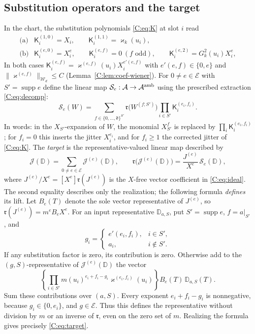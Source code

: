 \documentclass[11pt]{article}
\DeclareMathOperator{\supp}{supp}
\newcommand{\cW}{\mathcal{W}}
\newcommand{\cA}{\mathcal{A}}
\newcommand{\cE}{\mathcal{E}}
\newcommand{\cS}{\mathcal{S}}
\newcommand{\cJ}{\mathcal{J}}
\newcommand{\norm}[1]{\lVert #1\rVert}
\newcommand{\dg}{\mathfrak{d}}
\newcommand{\K}{\mathsf{K}}
\newcommand{\realize}{\mathfrak r}
\begin{document}
\subsection{Substitution operators and the target}\label{C:sec:target}
In the chart, the substitution polynomials \eqref{C:eq:K} at slot \(i\)
read
\begin{equation}
\begin{array}{c|l}
 \text{(a)}&\K_i^{(1,0)}=X_i,\qquad \K_i^{(1,1)}=\varkappa_k(u_i),\\[2pt]
 \text{(b)}&\K_i^{(e,0)}=X_i^{e},\qquad \K_i^{(e,f)}=0\ (f\text{ odd}),\qquad \K_i^{(e,2)}=G_k^2(u_i)X_i^{e},
\end{array}
\label{C:eq:subst}
\end{equation}
In both cases \(\K_i^{(e,f)}=\varkappa^{(e,f)}(u_i)X_i^{e'(e,f)}\) with
\(e'(e,f)\in\{0,e\}\) and \(\norm{\varkappa^{(e,f)}}_{\cW_d}\le C\)
(Lemma~\ref{C:lem:coef-wiener}).
For \(0\ne e\in\cE\) with \(S'=\operatorname{supp}e\) define the linear
map \(\cS_e:\cA\to\cA^{\rm amb}\) using the prescribed extraction
\eqref{C:eq:decomp}:
\begin{equation}
 \cS_e(W)=\sum_{f\in\{0,\dots,\dg\}^{S'}}
 \realize\bigl(W^{(f;S')}\bigr)\prod_{i\in S'}\K_i^{(e_i,f_i)} .
 \label{C:eq:S-op}
\end{equation}
In words: in the \(X_{S'}\)-expansion of \(W\), the monomial \(X_{S'}^f\)
is replaced by \(\prod_i\K_i^{(e_i,f_i)}\); for \(f_i=0\) this inserts the
jitter \(X_i^{e_i}\), and for \(f_i\ge1\) the corrected jitter of
\eqref{C:eq:K}.  The \emph{target} is the representative-valued linear map described by
\begin{equation}
 \cJ(\mathbb D)=\sum_{0\ne e\in\cE}\cJ^{(e)}(\mathbb D),\qquad
 \realize\bigl(\cJ^{(e)}(\mathbb D)\bigr)
   =\frac{J^{(e)}}{X^e}\,\cS_e(\mathbb D),
 \label{C:eq:target}
\end{equation}
where \(J^{(e)}/X^e=[X^e]\realize(J^{(e)})\) is the \(X\)-free vector
coefficient in \eqref{C:eq:ideal}.  The second equality describes only
the realization; the following formula \emph{defines} its lift.
Let \(B_e(T)\) denote the sole vector representative of \(J^{(e)}\), so
\(\realize(J^{(e)})=m^eB_eX^e\).  For an input representative
\(\mathbb D_{a,S}\), put \(S'=\supp e\), \(f=a|_{S'}\), and
\[
 g_i=\begin{cases}e'(e_i,f_i),&i\in S',\\a_i,&i\notin S'.\end{cases}
\]
If any substitution factor is zero, its contribution is zero.
Otherwise add to the \((g,S)\)-representative of
\(\cJ^{(e)}(\mathbb D)\) the vector
\[
 \left\{\prod_{i\in S'}
 m(u_i)^{e_i+f_i-g_i}\varkappa^{(e_i,f_i)}(u_i)\right\}
 B_e(T)\,\mathbb D_{a,S}(T).
\]
Sum these contributions over \((a,S)\).  Every exponent
\(e_i+f_i-g_i\) is nonnegative, because \(g_i\in\{0,e_i\}\), and
\(g\in\cE\).  Thus this defines the representative without division by
\(m\) or an inverse of \(\realize\), even on the zero set of \(m\).
Realizing the formula gives precisely \eqref{C:eq:target}.
\end{document}
